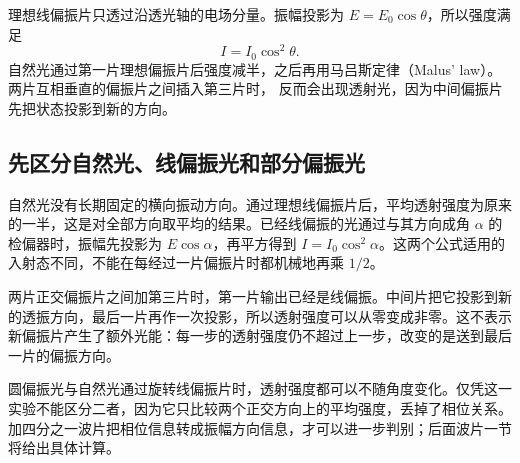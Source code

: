 理想线偏振片只透过沿透光轴的电场分量。振幅投影为 $E=E_0\cos\theta$，所以强度满足
\begin{equation}
 I=I_0\cos^2\theta.
\end{equation}
自然光通过第一片理想偏振片后强度减半，之后再用马吕斯定律（Malus' law）。两片互相垂直的偏振片之间插入第三片时，
反而会出现透射光，因为中间偏振片先把状态投影到新的方向。


\subsection{先区分自然光、线偏振光和部分偏振光}
自然光没有长期固定的横向振动方向。通过理想线偏振片后，平均透射强度为原来的一半，这是对全部方向取平均的结果。已经线偏振的光通过与其方向成角 $\alpha$ 的检偏器时，振幅先投影为 $E\cos\alpha$，再平方得到 $I=I_0\cos^2\alpha$。这两个公式适用的入射态不同，不能在每经过一片偏振片时都机械地再乘 $1/2$。

两片正交偏振片之间加第三片时，第一片输出已经是线偏振。中间片把它投影到新的透振方向，最后一片再作一次投影，所以透射强度可以从零变成非零。这不表示新偏振片产生了额外光能：每一步的透射强度仍不超过上一步，改变的是送到最后一片的偏振方向。

圆偏振光与自然光通过旋转线偏振片时，透射强度都可以不随角度变化。仅凭这一实验不能区分二者，因为它只比较两个正交方向上的平均强度，丢掉了相位关系。加四分之一波片把相位信息转成振幅方向信息，才可以进一步判别；后面波片一节将给出具体计算。


